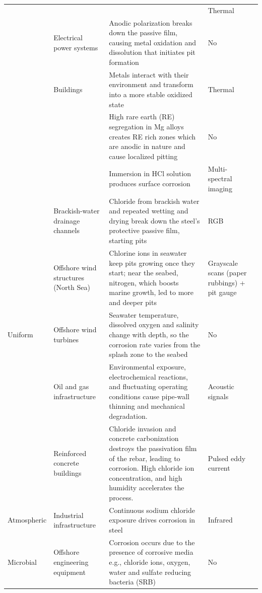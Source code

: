 {\begin{xltabular}{\textwidth}{>{\RaggedRight\arraybackslash}p{1.5cm}>{\RaggedRight\arraybackslash}p{2.6cm}>{\RaggedRight\arraybackslash}X>{\RaggedRight\arraybackslash}p{2.4cm}>{\RaggedRight\arraybackslash}p{1.9cm}}
 &  &  & Thermal & \citep{Liu2021} \\
 & Electrical power systems & Anodic polarization breaks down the passive film, causing metal oxidation and dissolution that initiates pit formation & No & \citep{Wojciechowski2025} \\
 & Buildings & Metals interact with their environment and transform into a more stable oxidized state & Thermal & \citep{Elizalde2023} \\
 &  & High rare earth (RE) segregation in Mg alloys creates RE rich zones which are anodic in nature and cause localized pitting & No & \citep{Qin2026} \\
 &  & Immersion in HCl solution produces surface corrosion & Multi-spectral imaging & \citep{Egodawela2025} \\
 & Brackish-water drainage channels & Chloride from brackish water and repeated wetting and drying break down the steel's protective passive film, starting pits & RGB & \citep{Suzuki2026} \\
 & Offshore wind structures (North Sea) & Chlorine ions in seawater keep pits growing once they start; near the seabed, nitrogen, which boosts marine growth, led to more and deeper pits & Grayscale scans (paper rubbings) + pit gauge & \citep{Khodabux2021a} \\
\midrule
Uniform & Offshore wind turbines & Seawater temperature, dissolved oxygen and salinity change with depth, so the corrosion rate varies from the splash zone to the seabed & No & \citep{Khodabux2020} \\
 & Oil and gas infrastructure & Environmental exposure, electrochemical reactions, and fluctuating operating conditions cause pipe-wall thinning and mechanical degradation. & Acoustic signals & \citep{Yang2026a} \\
 & Reinforced concrete buildings & Chloride invasion and concrete carbonization destroys the passivation film of the rebar, leading to corrosion. High chloride ion concentration, and high humidity accelerates the process. & Pulsed eddy current & \citep{Yang2025} \\
\midrule
Atmospheric & Industrial infrastructure & Continuous sodium chloride exposure drives corrosion in steel & Infrared & \citep{DeKerf2022} \\
\midrule
Microbial & Offshore engineering equipment & Corrosion occurs due to the presence of corrosive media e.g., chloride ions, oxygen, water and sulfate reducing bacteria (SRB) & No & \citep{Liang2021} \\
\end{xltabular}
}


